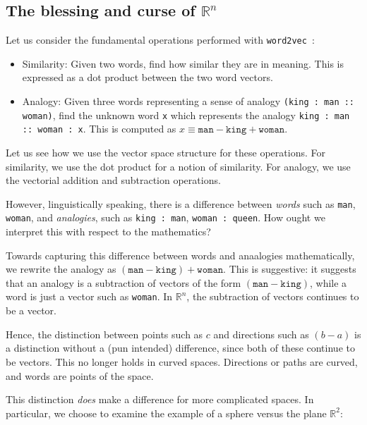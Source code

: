 \documentclass[11pt]{book}
\newcommand{\wtov}{\texttt{word2vec }}
\begin{document}
\subsection{The blessing and curse of $\mathbb{R}^n$}

Let us consider the fundamental operations performed with \wtov:

\begin{itemize}
\item Similarity: Given two words, find how similar they are in meaning. This is
     expressed as a dot product between the two word vectors.
\item Analogy: Given three words representing a sense of analogy \texttt{(king : man :: woman)},
      find the unknown word \texttt{x} which represents the analogy
      \texttt{king : man :: woman : x}. This is computed as $x \equiv \texttt{man} - \texttt{king} + \texttt{woman}$.
\end{itemize}

Let us see how we use the vector space structure for these operations.
For similarity, we use the dot product for a notion of similarity. For 
analogy, we use the vectorial addition and subtraction operations.

However, linguistically speaking, there is a difference between \emph{words}
such as \texttt{man}, \texttt{woman}, and \emph{analogies}, such as
\texttt{king : man}, \texttt{woman : queen}. How ought we interpret this
with respect to the mathematics?

Towards capturing this difference between words and anaalogies mathematically,
we rewrite the analogy as $(\texttt{man} - \texttt{king}) + \texttt{woman}$.
This is suggestive: it suggests that an analogy is a subtraction of
vectors of the form $(\texttt{man}-\texttt{king})$, while a word is just a vector
such as \texttt{woman}.
In $\mathbb{R}^n$, the subtraction of vectors continues to  be a vector.

Hence, the distinction between points such as $c$  and directions such as $(b - a)$
is a distinction without a (pun intended) difference, since both of these
continue to be vectors.  This no longer holds in curved spaces. Directions or
paths are curved, and words are points of the space.


This distinction \emph{does} make a difference for more complicated spaces.
In particular, we choose to examine the example of a sphere versus the plane 
$\mathbb R^2$:
\end{document}
